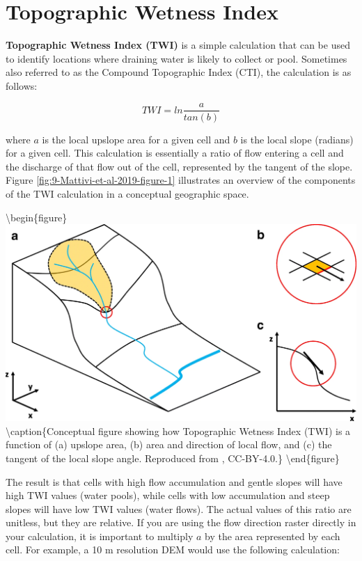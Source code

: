 \documentclass[
]{book}
\begin{document}
\hypertarget{topographic-wetness-index}{%
\section{Topographic Wetness Index}\label{topographic-wetness-index}}

\textbf{Topographic Wetness Index (TWI)} is a simple calculation that can be used to identify locations where draining water is likely to collect or pool. Sometimes also referred to as the Compound Topographic Index (CTI), the calculation is as follows:

\[
TWI=ln\frac{a}{tan(b)}
\]

where \(a\) is the local upslope area for a given cell and \(b\) is the local slope (radians) for a given cell. This calculation is essentially a ratio of flow entering a cell and the discharge of that flow out of the cell, represented by the tangent of the slope. Figure \ref{fig:9-Mattivi-et-al-2019-figure-1} illustrates an overview of the components of the TWI calculation in a conceptual geographic space.

\textbackslash begin\{figure\}
\includegraphics[width=0.75\linewidth]{images/09-Mattivi-et-al-2019-figure-1} \textbackslash caption\{Conceptual figure showing how Topographic Wetness Index (TWI) is a function of (a) upslope area, (b) area and direction of local flow, and (c) the tangent of the local slope angle. Reproduced from \citet{mattivi_twi_2019}, CC-BY-4.0.\}\label{fig:9-Mattivi-et-al-2019-figure-1}
\textbackslash end\{figure\}

The result is that cells with high flow accumulation and gentle slopes will have high TWI values (water pools), while cells with low accumulation and steep slopes will have low TWI values (water flows). The actual values of this ratio are unitless, but they are relative. If you are using the flow direction raster directly in your calculation, it is important to multiply \(a\) by the area represented by each cell. For example, a 10 m resolution DEM would use the following calculation:
\end{document}
